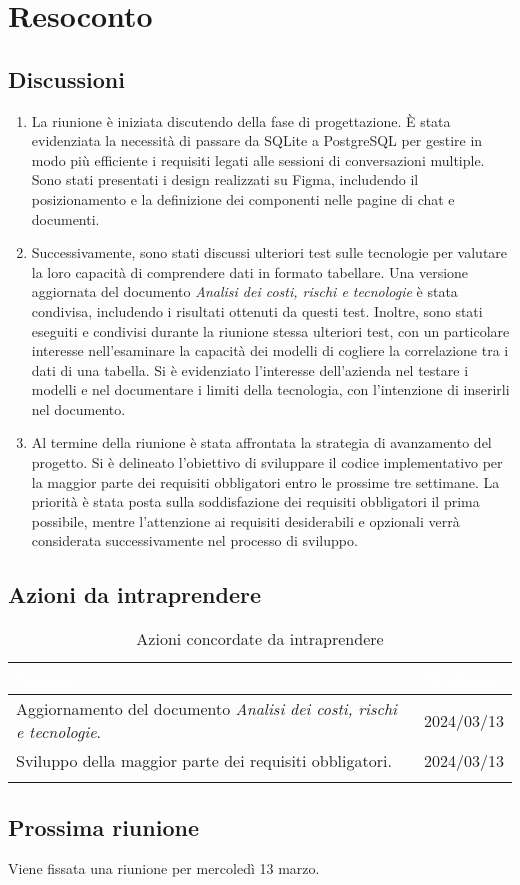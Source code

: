 \section{Resoconto} \label{sec:resoconto}
\subsection{Discussioni} \label{subsec:resdiscussione}
\begin{enumerate}
    \item La riunione è iniziata discutendo della fase di progettazione. È stata evidenziata la necessità di passare da SQLite a PostgreSQL per gestire in modo più efficiente i requisiti legati alle sessioni di conversazioni multiple. Sono stati presentati i design realizzati su Figma, includendo il posizionamento e la definizione dei componenti nelle pagine di chat e documenti.
    \item Successivamente, sono stati discussi ulteriori test sulle tecnologie per valutare la loro capacità di comprendere dati in formato tabellare. Una versione aggiornata del documento \textit{Analisi dei costi, rischi e tecnologie} è stata condivisa, includendo i risultati ottenuti da questi test. Inoltre, sono stati eseguiti e condivisi durante la riunione stessa ulteriori test, con un particolare interesse nell'esaminare la capacità dei modelli di cogliere la correlazione tra i dati di una tabella. Si è evidenziato l'interesse dell'azienda nel testare i modelli e nel documentare i limiti della tecnologia, con l'intenzione di inserirli nel documento.
    \item Al termine della riunione è stata affrontata la strategia di avanzamento del progetto. Si è delineato l'obiettivo di sviluppare il codice implementativo per la maggior parte dei requisiti obbligatori entro le prossime tre settimane. La priorità è stata posta sulla soddisfazione dei requisiti obbligatori il prima possibile, mentre l'attenzione ai requisiti desiderabili e opzionali verrà considerata successivamente nel processo di sviluppo.
\end{enumerate}


\subsection{Azioni da intraprendere} \label{subsec:action}

{
\setlength{\tabcolsep}{10pt}
\renewcommand{\arraystretch}{1.5}
\begin{xltabular}{\textwidth}{| X | c |}
    \hline
     \textbf{\textcolor{white}{Azione}} & \textbf{\textcolor{white}{Scadenza}} \\
    \hline
    \endhead
   Aggiornamento del documento \textit{Analisi dei costi, rischi e tecnologie}. & 2024/03/13\\
    \hline
    Sviluppo della maggior parte dei requisiti obbligatori. & 2024/03/13\\
    \hline
     \caption{Azioni concordate da intraprendere}
    \label{tab:reqimp}
\end{xltabular}
}


\subsection{Prossima riunione} \label{subsec:riunione}
Viene fissata una riunione per mercoledì 13 marzo.
\newpage
